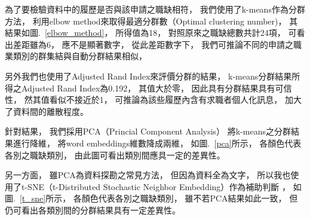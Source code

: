\documentclass[acmsmall]{acmart}
\begin{document}
為了要檢驗資料中的履歷是否與該申請之職缺相符，
我們使用了k-means\cite{macqueen1967some}作為分群方法，
利用elbow method來取得最適分群數（Optimal clustering number)，
其結果如圖.~\ref{elbow_method}，
所得值為18，
對照原來之職缺總數共計24項，
可看出差距雖為6，
應不是顯著數字，
從此差距數字下，
我們可推論不同的申請之職業類別的群集結與自動分群結果相似，

另外我們也使用了Adjusted Rand Index來評價分群的結果\cite{hubert1985comparing}，
k-means分群結果所得之Adjusted Rand Index為0.192，
其值大於零，
因此具有分群結果具有可信性，
然其值看似不接近於1，
可推論為該些履歷內含有求職者個人化訊息，
加大了資料間的離散程度。

針對結果，
我們採用PCA（Princial Component Analysis）\cite{pearson1901liii} \cite{han2011data}將k-means之分群結果進行降維，
將word embeddings維數降成兩維，
如圖.~\ref{pca}所示，
各顏色代表各別之職缺類別，
由此圖可看出類別間應具一定的差異性。

另一方面，
雖PCA為資料探勘之常見方法，
但因為資料全為文字，
所以我也使用了t-SNE（t-Distributed Stochastic Neighbor Embedding）\cite{van2008visualizing}作為補助判斷 ，
如圖.~\ref{t_sne}所示，
各顏色代表各別之職缺類別，
雖不若PCA結果如此一致，
但仍可看出各類別間的分群結果具有一定差異性。
\end{document}
